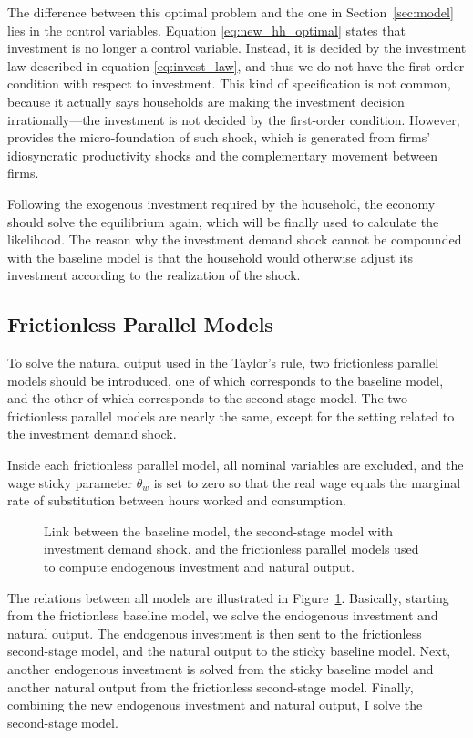 The difference between this optimal problem and the one in Section~\ref{sec:model} lies in the control variables. Equation \eqref{eq:new_hh_optimal} states that investment is no longer a control variable. Instead, it is decided by the investment law described in equation \eqref{eq:invest_law}, and thus we do not have the first-order condition with respect to investment. This kind of specification is not common, because it actually says households are making the investment decision irrationally---the investment is not decided by the first-order condition. However, \cite{nireiOriginsPropagationAnimal} provides the micro-foundation of such shock, which is generated from firms' idiosyncratic productivity shocks and the complementary movement between firms.

Following the exogenous investment required by the household, the economy should solve the equilibrium again, which will be finally used to calculate the likelihood. The reason why the investment demand shock cannot be compounded with the baseline model is that the household would otherwise adjust its investment according to the realization of the shock.

\subsection{Frictionless Parallel Models}
To solve the natural output used in the Taylor's rule, two frictionless parallel models should be introduced, one of which corresponds to the baseline model, and the other of which corresponds to the second-stage model. The two frictionless parallel models are nearly the same, except for the setting related to the investment demand shock.

Inside each frictionless parallel model, all nominal variables are excluded, and the wage sticky parameter $\theta_w$ is set to zero so that the real wage equals the marginal rate of substitution between hours worked and consumption.

\begin{figure}[htbp]
    \centering
    \resizebox{0.9\textwidth}{!}{%
    
    }
    \caption{Link between the baseline model, the second-stage model with investment demand shock, and the frictionless parallel models used to compute endogenous investment and natural output.}
    \label{fig:parallel_model}
\end{figure}

The relations between all models are illustrated in Figure~\ref{fig:parallel_model}. Basically, starting from the frictionless baseline model, we solve the endogenous investment and natural output. The endogenous investment is then sent to the frictionless second-stage model, and the natural output to the sticky baseline model. Next, another endogenous investment is solved from the sticky baseline model and another natural output from the frictionless second-stage model. Finally, combining the new endogenous investment and natural output, I solve the second-stage model.

